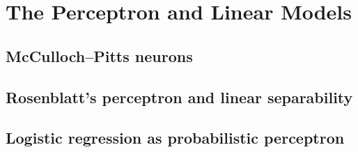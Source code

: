 ﻿\chapter{The Perceptron and Linear Models}
\section{McCulloch–Pitts neurons}

\section{Rosenblatt’s perceptron and linear separability}

\section{Logistic regression as probabilistic perceptron}



